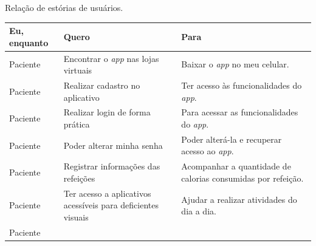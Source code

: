 \begin{quadro}[htb]
    \begin{center}
        \ABNTEXfontereduzida
        \caption{Relação de estórias de usuários.}
        \label{tab-est-usr}
        \begin{tabular}{p{2.0cm}|p{5.0cm}|p{7.0cm}}
            \textbf{Eu, enquanto}                                          & \textbf{Quero} & \textbf{Para}                     \\
            \hline
            Paciente                                                       &
            Encontrar o \emph{app} nas lojas virtuais                      &
            Baixar o \emph{app} no meu celular.                                                                                 \\
            \hline
            Paciente                                                       &
            Realizar cadastro no aplicativo                                &
            Ter acesso às funcionalidades do \emph{app}.                                                                        \\
            \hline
            Paciente                                                       &
            Realizar login de forma prática                                &
            Para acessar as funcionalidades do \emph{app}.                                                                      \\
            \hline
            Paciente                                                       &
            Poder alterar minha senha                                      &
            Poder alterá\@-la e recuperar acesso ao \emph{app}.                                                                 \\
            \hline
            Paciente                                                       &
            Registrar informações das refeições                            &
            Acompanhar a quantidade de calorias consumidas por refeição.                                                        \\
            \hline
            Paciente                                                       &
            Ter acesso a aplicativos acessíveis para deficientes visuais   &
            Ajudar a realizar atividades do dia a dia.                                                                          \\
            \hline
            Paciente                                                       &

\end{tabular}
\end{center}
\end{quadro}
